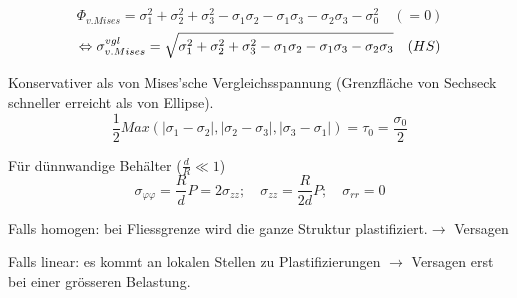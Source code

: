 \documentclass[a4paper,10pt]{article}
\begin{document}
\begin{multicols*}{3}
            \[\Phi_{v.Mises}= \sigma_1^2+\sigma_2^2+\sigma_3^2-\sigma_1\sigma_2-\sigma_1\sigma_3-\sigma_2\sigma_3 -\sigma_0^2\quad(=0)\]
            \[\Leftrightarrow \sigma_{v. Mises}^{vgl}= \sqrt{\sigma_1^2+\sigma_2^2+\sigma_3^2-\sigma_1\sigma_2-\sigma_1\sigma_3-\sigma_2\sigma_3} \quad\textrm(HS)\]
            
            Konservativer als von Mises'sche Vergleichsspannung (Grenzfläche von Sechseck schneller erreicht als von Ellipse).
            \[\frac{1}{2}Max(|\sigma_1-\sigma_2|,|\sigma_2-\sigma_3|,|\sigma_3-\sigma_1|)=\tau_0=\frac{\sigma_0}{2}\]
        
            Für dünnwandige Behälter ($\frac{d}{R} \ll 1$)
            \[\sigma_{\varphi\varphi} = \frac{R}{d}P = 2\sigma_{zz}; \quad \sigma_{zz} = \frac{R}{2d}P; \quad \sigma_{rr}=0\]
            

            Falls homogen: bei Fliessgrenze wird die ganze Struktur plastifiziert.$\rightarrow$ Versagen %
              
            Falls linear: es kommt an lokalen Stellen zu Plastifizierungen $\rightarrow$ Versagen erst bei einer grösseren Belastung.
        
        
      
\end{multicols*}
\end{document}
